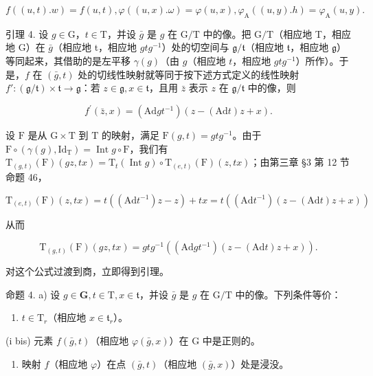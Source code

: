 \[
f ((u, t). w) = f (u, t), \varphi ((u, x). \omega) = \varphi (u, x), \varphi_ {\mathrm{A}} ((u, y). h) = \varphi_ {\mathrm{A}} (u, y).
\]

引理 4. 设 \(g \in \mathrm{G}\)，\(t \in \mathrm{T}\)，并设 \(\bar{g}\) 是 \(g\) 在 \(\mathrm{G} / \mathrm{T}\) 中的像。把 \(\mathrm{G} / \mathrm{T}\)（相应地 T，相应地 G）在 \(\bar{g}\)（相应地 t，相应地 \(gtg^{-1}\)）处的切空间与 \(\mathfrak{g} / \mathfrak{t}\)（相应地 \(\mathfrak{t}\)，相应地 \(\mathfrak{g}\)）等同起来，其借助的是左平移 \(\gamma(g)\)（由 \(g\)（相应地 \(t\)，相应地 \(gtg^{-1}\)）所作）。于是，\(f\) 在 \((\bar{g}, t)\) 处的切线性映射就等同于按下述方式定义的线性映射 \(f': (\mathfrak{g} / \mathfrak{t}) \times \mathfrak{t} \to \mathfrak{g}\)：若 \(z \in \mathfrak{g}, x \in \mathfrak{t}\)，且用 \(\bar{z}\) 表示 \(z\) 在 \(\mathfrak{g} / \mathfrak{t}\) 中的像，则

\[
f ^ {\prime} (\bar {z}, x) = (\mathrm{Ad} g t ^ {- 1}) (z - (\mathrm{Ad} t) z + x).
\]

设 \(\mathrm{F}\) 是从 \(\mathrm{G} \times \mathrm{T}\) 到 \(\mathrm{T}\) 的映射，满足 \(\mathrm{F}(g,t) = gtg^{-1}\)。由于 \(\mathrm{F} \circ (\gamma(g), \mathrm{Id}_{\mathrm{T}}) = \operatorname{Int} g \circ \mathrm{F}\)，我们有 \(\mathrm{T}_{(g,t)}(\mathrm{F})(gz, tx) = \mathrm{T}_t(\operatorname{Int} g) \circ \mathrm{T}_{(e,t)}(\mathrm{F})(z, tx)\)；由第三章 §3 第 12 节命题 46，

\[
\mathrm{T} _ {(e, t)} (\mathrm{F}) (z, t x) = t ((\mathrm{Ad} t ^ {- 1}) z - z) + t x = t ((\mathrm{Ad} t ^ {- 1}) (z - (\mathrm{Ad} t) z + x))
\]

从而

\[
\mathrm{T} _ {(g, t)} (\mathrm{F}) (g z, t x) = g t g ^ {- 1} ((\mathrm{Ad}   g t ^ {- 1}) (z - (\mathrm{Ad}   t) z + x)).
\]

对这个公式过渡到商，立即得到引理。

命题 4. a) 设 \(g \in \mathbf{G}, t \in \mathrm{T}, x \in \mathfrak{t}\)，并设 \(\bar{g}\) 是 \(g\) 在 \(\mathrm{G} / \mathrm{T}\) 中的像。下列条件等价：

\begin{enumerate}
\def\labelenumi{(\roman{enumi})}
\tightlist
\item
  \(t \in \mathrm{T}_r\)（相应地 \(x \in \mathfrak{t}_r\)）。
\end{enumerate}

(i bis) 元素 \(f(\bar{g}, t)\)（相应地 \(\varphi(\bar{g}, x)\)）在 G 中是正则的。

\begin{enumerate}
\def\labelenumi{(\roman{enumi})}
\setcounter{enumi}{1}
\tightlist
\item
  映射 \(f\)（相应地 \(\varphi\)）在点 \((\bar{g}, t)\)（相应地 \((\bar{g}, x)\)）处是浸没。
\end{enumerate}

